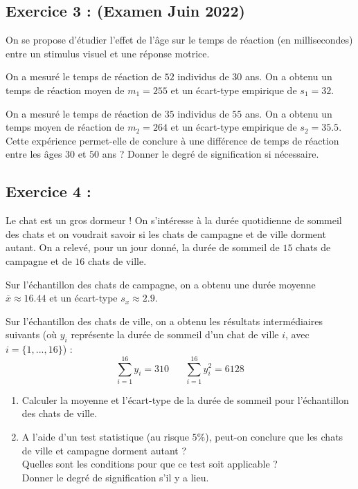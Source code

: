 \documentclass{article}
\numberwithin{equation}{section}
\begin{document}
\bigskip


\subsection*{ Exercice 3 : (Examen Juin 2022)} 
On se propose d'étudier l'effet de l'âge sur le temps de réaction (en millisecondes) entre un 
stimulus visuel et une  réponse motrice.

On a mesuré le temps de réaction de $52$ individus de $30$ ans. On a obtenu un temps de réaction moyen 
de $m_1=255$ et un écart-type empirique de $s_1=32$.

On a mesuré le temps de réaction de $35$ individus de $55$ ans. 
On a obtenu un temps moyen de réaction de $m_2=264$ et un écart-type empirique de $s_2=35.5$.  \\

Cette expérience permet-elle de conclure à une différence de temps de réaction entre les âges 
$30$ et $50$ ans ? Donner le degré de signification si nécessaire.

\bigskip


\subsection*{ Exercice 4 : } 
Le chat est un gros dormeur ! On s'intéresse à la durée quotidienne de sommeil des chats et on voudrait savoir si les chats de campagne et de ville dorment autant. 
On a relevé, pour un jour donné, la durée de sommeil de $15$ chats de campagne et de $16$ chats de ville.  

Sur l'échantillon des chats de campagne, on a obtenu une durée moyenne $\overline{x} \approx 16.44$ et un écart-type $s_x \approx 2.9$. 

Sur l'échantillon des chats de ville, on a obtenu les résultats intermédiaires suivants (où $y_i$ représente la durée de sommeil d'un 
chat de ville $i$, avec $i=\{1, ...,16\}$) : 
$$
\sum_{i=1}^{16} y_i = 310 \;\;\;\;\;\; \sum_{i=1}^{16} y_i^2 = 6128 
$$
\begin{enumerate}
\item Calculer la moyenne et l'écart-type de la durée de sommeil pour l'échantillon des chats de ville.
\item A l'aide d'un test statistique (au risque $5\%$), peut-on conclure que les chats de ville et 
campagne dorment autant ? \\
Quelles sont les conditions pour que ce test soit applicable ? \\
Donner le degré de signification s'il y a lieu.\\
\end{enumerate}
\end{document}
